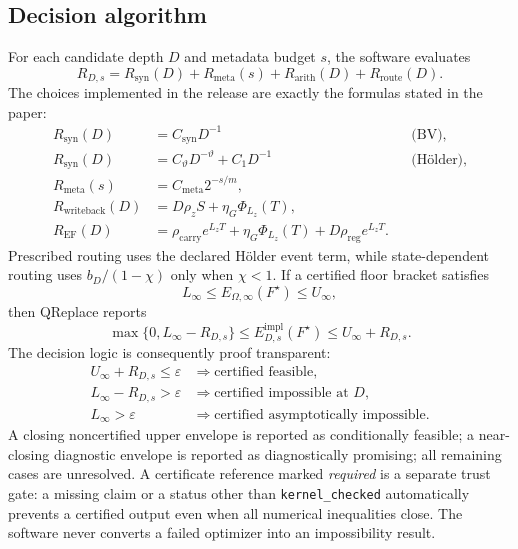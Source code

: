 \documentclass[twoside,11pt]{article}
\newcommand{\eps}{\varepsilon}
\begin{document}
\subsection{Decision algorithm}
\label{app:qreplace-algorithm}

For each candidate depth $D$ and metadata budget $s$, the software evaluates
\begin{equation}
 R_{D,s}=R_{\mathrm{syn}}(D)+R_{\mathrm{meta}}(s)
          +R_{\mathrm{arith}}(D)+R_{\mathrm{route}}(D).
 \label{eq:qreplace-radius}
\end{equation}
The choices implemented in the release are exactly the formulas stated in the
paper:
\begin{align*}
 R_{\mathrm{syn}}(D)
   &= C_{\mathrm{syn}}D^{-1}
      &&\text{(BV)},\\
 R_{\mathrm{syn}}(D)
   &= C_{\vartheta}D^{-\vartheta}+C_1D^{-1}
      &&\text{(H\"older)},\\
 R_{\mathrm{meta}}(s)
   &= C_{\mathrm{meta}}2^{-s/m},\\
 R_{\mathrm{writeback}}(D)
   &=D\rho_zS+\eta_G\Phi_{L_z}(T),\\
 R_{\mathrm{EF}}(D)
   &=\rho_{\mathrm{carry}}e^{L_zT}
     +\eta_G\Phi_{L_z}(T)
     +D\rho_{\mathrm{reg}}e^{L_zT}.
\end{align*}
Prescribed routing uses the declared H\"older event term, while state-dependent
routing uses $b_D/(1-\chi)$ only when $\chi<1$.  If a certified floor bracket
satisfies
\[
 L_\infty\le E_{\Omega,\infty}(F^\star)\le U_\infty,
\]
then QReplace reports
\begin{equation}
 \max\{0,L_\infty-R_{D,s}\}
 \le E_{D,s}^{\mathrm{impl}}(F^\star)
 \le U_\infty+R_{D,s}.
 \label{eq:qreplace-interval}
\end{equation}
The decision logic is consequently proof transparent:
\begin{align*}
 U_\infty+R_{D,s}\le\eps
   &\Longrightarrow \text{certified feasible},\\
 L_\infty-R_{D,s}>\eps
   &\Longrightarrow \text{certified impossible at }D,\\
 L_\infty>\eps
   &\Longrightarrow \text{certified asymptotically impossible}.
\end{align*}
A closing noncertified upper envelope is reported as conditionally feasible;
a near-closing diagnostic envelope is reported as diagnostically promising;
all remaining cases are unresolved.  A certificate reference marked
\emph{required} is a separate trust gate: a missing claim or a status other
than \texttt{kernel\_checked} automatically prevents a certified output even
when all numerical inequalities close.  The software never converts a failed
optimizer into an impossibility result.
\end{document}
